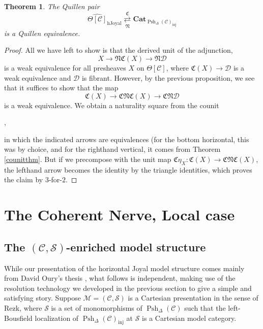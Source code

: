 \documentclass[leqno]{article}
\numberwithin{equation}{subsection}
\theoremstyle{plain}   %
\newtheorem{thm}[equation]{Theorem}
\theoremstyle{remark}
\theoremstyle{plain}
\newcommand{\Cat}{\ensuremath{\mathbf{Cat}}}
\newcommand{\C}{\ensuremath{\mathcal{C}}}
\newcommand{\M}{\ensuremath{\mathcal{M}}}
\newcommand{\setS}{\ensuremath{\mathscr{S}}}
\newcommand{\cellset}{\ensuremath{\widehat{\Theta[\mathcal{C}]}}}
\newcommand{\spsh}{\ensuremath{\operatorname{Psh}_\Delta(\mathcal{C})}}
\begin{document}
\begin{thm}\label{mainthm1}
	The Quillen pair
	\[\cellset_{\mathrm{hJoyal}} \underset{\mathfrak{N}}{\overset{\mathfrak{C}}{\rightleftarrows}} \Cat_{\spsh_{\mathrm{inj}}}\]
	is a Quillen equivalence.
\end{thm}
\begin{proof}
	All we have left to show is that the derived unit of the adjunction,
	\[X\to \mathfrak{N}\mathfrak{C}(X) \to \mathfrak{N}\mathcal{D}\]
	is a weak equivalence for all presheaves \(X\) on \(\Theta[\C]\), where \(\mathfrak{C}(X) \to \mathcal{D}\) is a weak equivalence and \(\mathcal{D}\) is fibrant.  However, by the previous proposition, we see that it suffices to show that the map
	\[\mathfrak{C}(X)\to \mathfrak{C}\mathfrak{N}\mathfrak{C}(X) \to \mathfrak{C}\mathfrak{N}\mathcal{D}\]
	is a weak equivalence.  We obtain a naturality square from the counit
	\begin{center}
		,
	\end{center}
	in which the indicated arrows are equivalences (for the bottom horizontal, this was by choice, and for the righthand vertical, it comes from Theorem \ref{counitthm}.  But if we precompose with the unit map \(\mathfrak{C}\eta_X:\mathfrak{C}(X)\to \mathfrak{C}\mathfrak{N}\mathfrak{C}(X)\), the lefthand arrow becomes the identity by the triangle identities, which proves the claim by \(3\)-for-\(2\).
\end{proof}

\section{The Coherent Nerve, Local case}
\subsection{The \((\C,\setS)\)-enriched model structure}\label{rezkvert}
While our presentation of the horizontal Joyal model structure comes mainly from David Oury's thesis \cite{oury}, what follows is independent, making use of the resolution technology we developed in the previous section to give a simple and satisfying story. Suppose \(\M=(\C,\setS)\) is a Cartesian presentation in the sense of Rezk, where \(\setS\) is a set of monomorphisms of \(\spsh\) such that the left-Bousfield localization of \(\spsh_\mathrm{inj}\) at \(\setS\) is a Cartesian model category.  
\end{document}
